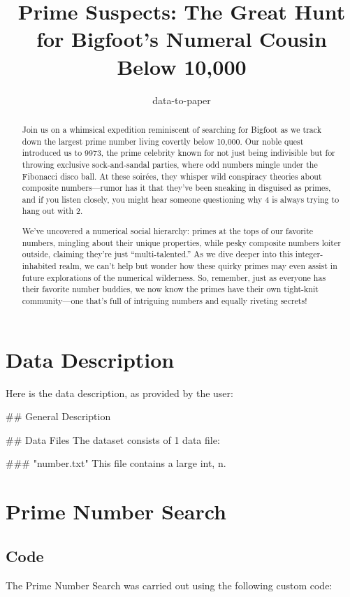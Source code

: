 \documentclass[11pt]{article}
\title{Prime Suspects: The Great Hunt for Bigfoot’s Numeral Cousin Below 10,000}
\author{data-to-paper}
\begin{document}
\maketitle
\begin{abstract}
Join us on a whimsical expedition reminiscent of searching for Bigfoot as we track down the largest prime number living covertly below 10,000. Our noble quest introduced us to 9973, the prime celebrity known for not just being indivisible but for throwing exclusive sock-and-sandal parties, where odd numbers mingle under the Fibonacci disco ball. At these soirées, they whisper wild conspiracy theories about composite numbers—rumor has it that they’ve been sneaking in disguised as primes, and if you listen closely, you might hear someone questioning why 4 is always trying to hang out with 2. 

We’ve uncovered a numerical social hierarchy: primes at the tops of our favorite numbers, mingling about their unique properties, while pesky composite numbers loiter outside, claiming they’re just “multi-talented.” As we dive deeper into this integer-inhabited realm, we can't help but wonder how these quirky primes may even assist in future explorations of the numerical wilderness. So, remember, just as everyone has their favorite number buddies, we now know the primes have their own tight-knit community—one that’s full of intriguing numbers and equally riveting secrets!
\end{abstract}

\clearpage
\appendix

\section{Data Description} \label{sec:data_description} Here is the data description, as provided by the user:

\begin{codeoutput}
\#\# General Description

\#\# Data Files
The dataset consists of 1 data file:

\#\#\# "number.txt"
This file contains a large int, n.


\end{codeoutput}

\section{Prime Number Search}
\subsection{{Code}}
The Prime Number Search was carried out using the following custom code:
\end{document}
